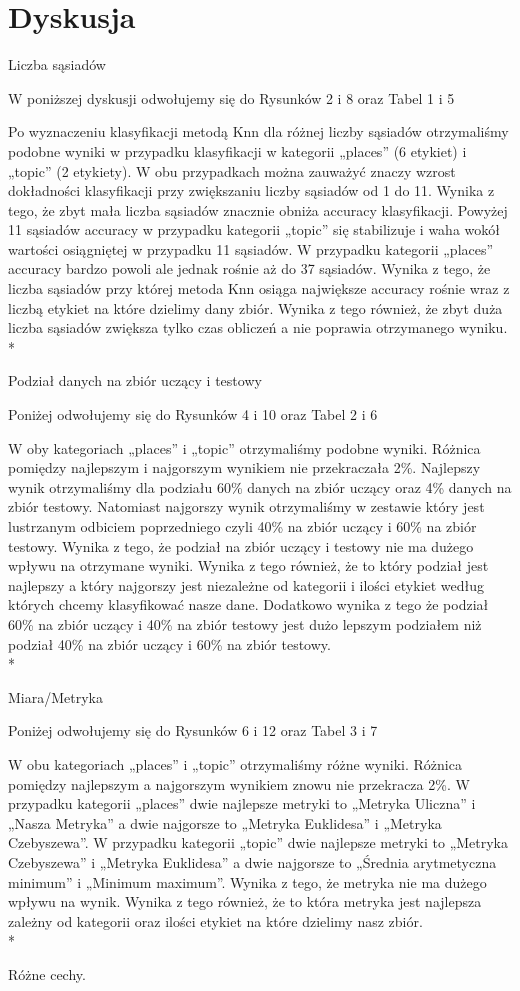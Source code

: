 \documentclass{classrep}
\begin{document}
\section{Dyskusja}
{

Liczba sąsiadów

W poniższej dyskusji odwołujemy się do Rysunków 2 i 8 oraz Tabel 1 i 5

Po wyznaczeniu klasyfikacji metodą Knn dla różnej liczby sąsiadów otrzymaliśmy podobne wyniki w przypadku klasyfikacji w kategorii „places” (6 etykiet) i „topic” (2 etykiety). W obu przypadkach można zauważyć znaczy wzrost dokładności klasyfikacji przy zwiększaniu liczby sąsiadów od 1 do 11. Wynika z tego, że zbyt mała liczba sąsiadów znacznie obniża accuracy klasyfikacji. Powyżej 11 sąsiadów accuracy w przypadku kategorii „topic” się stabilizuje i waha wokół wartości osiągniętej w przypadku 11 sąsiadów.  W przypadku kategorii „places” accuracy bardzo powoli ale jednak rośnie aż do 37 sąsiadów. Wynika z tego, że liczba sąsiadów przy której metoda Knn osiąga największe accuracy rośnie wraz z liczbą etykiet na które dzielimy dany zbiór. Wynika z tego również, że zbyt duża liczba sąsiadów zwiększa tylko czas obliczeń a nie poprawia otrzymanego wyniku.
\\*
\par Podział danych na zbiór uczący i testowy

Poniżej odwołujemy się do Rysunków 4 i 10 oraz Tabel 2 i 6

W oby kategoriach „places” i „topic” otrzymaliśmy podobne wyniki. Różnica pomiędzy najlepszym i najgorszym wynikiem nie przekraczała 2\%. Najlepszy wynik otrzymaliśmy dla podziału 60\% danych na zbiór uczący oraz 4\% danych na zbiór testowy. Natomiast najgorszy wynik otrzymaliśmy w zestawie który jest lustrzanym odbiciem poprzedniego czyli 40\% na zbiór uczący i 60\% na zbiór testowy. Wynika z tego, że podział na zbiór uczący i testowy nie ma dużego wpływu na otrzymane wyniki. Wynika z tego również, że to który podział jest najlepszy a który najgorszy jest niezależne od kategorii i ilości etykiet według których chcemy klasyfikować nasze dane. Dodatkowo wynika z tego że podział 60\% na zbiór uczący i 40\% na zbiór testowy jest dużo lepszym podziałem niż podział 40\% na zbiór uczący i 60\% na zbiór testowy.
\\*
\par Miara/Metryka

Poniżej odwołujemy się do Rysunków 6 i 12 oraz Tabel 3 i 7

W obu kategoriach „places” i „topic” otrzymaliśmy różne wyniki. Różnica pomiędzy najlepszym a najgorszym wynikiem znowu nie przekracza 2\%. W przypadku kategorii „places” dwie najlepsze metryki to „Metryka Uliczna” i „Nasza Metryka” a dwie najgorsze to „Metryka Euklidesa” i „Metryka Czebyszewa”. W przypadku kategorii „topic” dwie najlepsze metryki to „Metryka Czebyszewa” i „Metryka Euklidesa” a dwie najgorsze to „Średnia arytmetyczna minimum” i „Minimum maximum”. Wynika z tego, że metryka nie ma dużego wpływu na wynik. Wynika z tego również, że to która metryka jest najlepsza zależny od kategorii oraz ilości etykiet na które dzielimy nasz zbiór.
\\*
\par Różne cechy.

}
\end{document}
